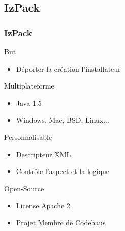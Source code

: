 \subsection{IzPack}
\begin{frame}\frametitle{IzPack}
\begin{minipage}[c]{.46\linewidth}
	\begin{beamerboxesrounded}[shadow=true]{But}
		\begin{itemize}
		\item Déporter la création l'installateur
		\end{itemize}
	\end{beamerboxesrounded}
\end{minipage}
\hfill
\begin{minipage}[c]{.46\linewidth}
	\begin{beamerboxesrounded}[shadow=true]{Multiplateforme}
		\begin{itemize}
		\item Java 1.5
		\item Windows, Mac, BSD, Linux...
		\end{itemize}
	\end{beamerboxesrounded}
\end{minipage}
\vfill
\begin{minipage}[c]{.46\linewidth}
	\begin{beamerboxesrounded}[shadow=true]{Personnalisable}
		\begin{itemize}
		\item Descripteur XML 
		\item Contrôle l'aspect et la logique
		\end{itemize}
	\end{beamerboxesrounded}
\end{minipage}
\hfill
\begin{minipage}[c]{.46\linewidth}
	\begin{beamerboxesrounded}[shadow=true]{Open-Source}
		\begin{itemize}
		\item License Apache 2
		\item Projet Membre de Codehaus
		\end{itemize}
	\end{beamerboxesrounded}
\end{minipage}
\end{frame}
